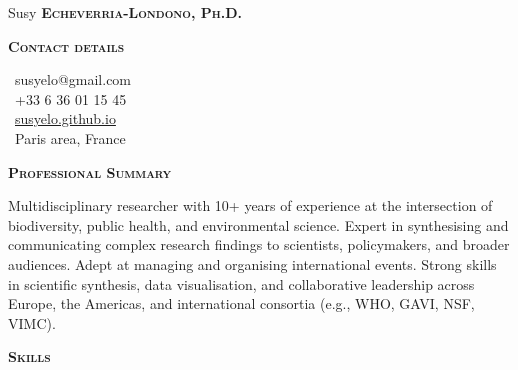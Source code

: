\documentclass[10pt, a4paper]{article}
\newcommand{\headleft}[1]{\vspace*{3ex}\textsc{\textbf{#1}}\par%
    \vspace*{-1.5ex}\hrulefill\par\vspace*{0.7ex}}
\begin{document}
\setlength{\topskip}{0pt}
\setlength{\parindent}{0pt}
\setlength{\parskip}{0pt}
\setlength{\fboxsep}{0pt}
\pagestyle{empty}
\raggedbottom

\begin{minipage}[t]{0.33\textwidth} %
\colorbox{cvblue}{\begin{minipage}[t][5mm][t]{\textwidth}\null\hfill\null\end{minipage}}

\vspace{-.2ex} %
\colorbox{cvblue!90}{\color{white}  %
\textwidth\relax%
\begin{minipage}[t][293mm][t]{0.82\textwidth}
\raggedright
\vspace*{2.5ex}

\Large Susy \textbf{\textsc{Echeverria-Londono, Ph.D.}} \normalsize 


\headleft{Contact details}
\small %
\MVAt\ {\small susyelo@gmail.com} \\[0.4ex]
\Mobilefone\ +33 6 36 01 15 45 \\[0.5ex]
\Mundus\ \href{https://susyelo.github.io/}{susyelo.github.io} \\[0.1ex]
\Letter\ Paris area, France
\normalsize

\vspace*{0.5ex} %

\headleft{Professional Summary}
Multidisciplinary researcher with 10+ years of experience at the intersection of biodiversity, public health, and environmental science. Expert in synthesising and communicating complex research findings to scientists, policymakers, and broader audiences. Adept at managing and organising international events. Strong skills in scientific synthesis, data visualisation, and collaborative leadership across Europe, the Americas, and international consortia (e.g., WHO, GAVI, NSF, VIMC).

\headleft{Skills}
\begin{itemize}


\end{itemize}
\end{minipage}}
\end{minipage}
\end{document}
